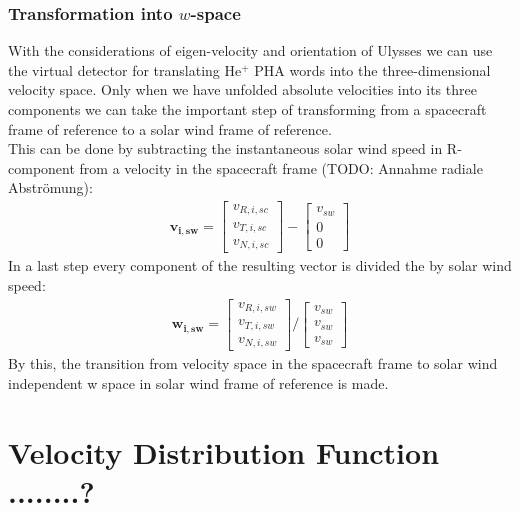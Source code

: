 \subsubsection{Transformation into $w$-space}
With the considerations of eigen-velocity and orientation of Ulysses we can use the virtual detector for translating $\mathrm{He^{+}}$ PHA words into the three-dimensional velocity space. Only when we have unfolded absolute velocities into its three components we can take the important step of transforming from a spacecraft frame of reference to a solar wind frame of reference. \\
This can be done by subtracting the instantaneous solar wind speed in R-component from a velocity in the spacecraft frame (TODO: Annahme radiale Abströmung): 
\begin{align*}
\mathbf{v_{i,sw}} = \begin{bmatrix}v_{R,i,sc}\\v_{T,i,sc}\\v_{N,i,sc}\end{bmatrix} - \begin{bmatrix}v_{sw}\\0\\0\end{bmatrix}
\end{align*}
In a last step every component of the resulting vector is divided the by solar wind speed:
\begin{align*}
\mathbf{w_{i,sw}} = \begin{bmatrix}v_{R,i,sw}\\v_{T,i,sw}\\v_{N,i,sw}\end{bmatrix} / \begin{bmatrix}v_{sw}\\v_{sw}\\v_{sw}\end{bmatrix}
\end{align*}
By this, the transition from velocity space in the spacecraft frame to solar wind independent w space in solar wind frame of reference is made.
%
%
%
\section{Velocity Distribution Function ........?}

%
